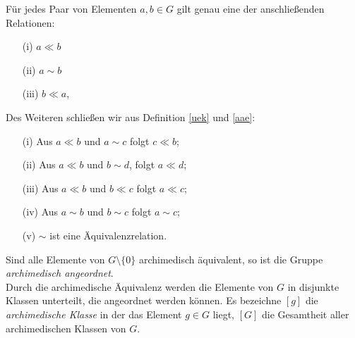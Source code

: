 \begin{folg}
Für jedes Paar von Elementen $a, b \in G$ gilt genau eine der anschließenden Relationen: 
\begin{multicols}{3}
\begin{enumerate}
\item[(i)] $a \ll b$
\item[(ii)] $a \sim b$
\item[(iii)] $b \ll a$, 
\end{enumerate}
\end{multicols}
%
Des Weiteren schließen wir aus Definition \ref{uek} und \ref{aae}:
\begin{enumerate}
\item[(i)] Aus $a \ll b$ und $a \sim c$ folgt $c \ll b$;
\item[(ii)] Aus $a \ll b$ und $b \sim d$, folgt $a \ll d$;
\item[(iii)] Aus $a \ll b$ und $b \ll c$ folgt $a \ll c$;
\item[(iv)] Aus $a \sim b$ und $b \sim c$ folgt $a \sim c$;
\item[(v)] $\sim$ ist eine Äquivalenzrelation.
\end{enumerate}
Sind alle Elemente von $G\setminus\lbrace 0 \rbrace$ archimedisch äquivalent, so ist die Gruppe \textit{archimedisch angeordnet}. \\ 
Durch die archimedische Äquivalenz werden die Elemente von $G$ in disjunkte Klassen unterteilt, die angeordnet werden können. Es bezeichne $[g]$ die \textit{archimedische Klasse} in der das Element $g \in G$ liegt, $[G]$ die Gesamtheit aller archimedischen Klassen von $G$. \label{archimedischeKlassen}\\
\end{folg}
%
%
%
